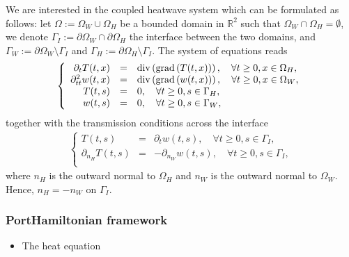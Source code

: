 \documentclass[letterpaper,10pt,english]{sphinxmanual}
\begin{document}
\sphinxAtStartPar
We are interested in the coupled heat\sphinxhyphen{}wave system which can be
formulated as follows: let \(\Omega := \Omega_W \cup \Omega_H\) be a
bounded domain in \(\mathbb{R}^2\) such that
\(\Omega_W \cap \Omega_H = \emptyset\), we denote
\(\Gamma_I := \partial\Omega_W \cap \partial\Omega_H\) the interface
between the two domains, and
\(\Gamma_W := \partial\Omega_W \setminus \Gamma_I\) and
\(\Gamma_H := \partial\Omega_H \setminus \Gamma_I\). The system of
equations reads
\begin{equation*}
\begin{split}\left\lbrace
\begin{array}{rcl}
\partial_t T(t,x) &=& {\rm div}\left( {\rm grad}\left( T(t,x) \right)\right), \quad \forall t\ge0, x \in \Omega_H, \\
\partial_{tt}^2 w(t,x) &=& {\rm div}\left( {\rm grad}\left( w(t,x) \right)\right), \quad \forall t\ge0, x \in \Omega_W, \\
T(t,s) &=& 0, \quad \forall t\ge0, s \in \Gamma_H, \\
w(t,s) &=& 0, \quad \forall t\ge0, s \in \Gamma_W, \\
\end{array}
\right.\end{split}
\end{equation*}
\sphinxAtStartPar
together with the transmission conditions across the interface
\begin{equation*}
\begin{split}\left\lbrace
\begin{array}{rcl}
T(t,s) &=& \partial_t w(t,s), \quad \forall t\ge0, s \in \Gamma_I, \\
\partial_{n_H} T(t,s) &=& - \partial_{n_W} w(t,s), \quad \forall t\ge0, s \in \Gamma_I, \\
\end{array}
\right.\end{split}
\end{equation*}
\sphinxAtStartPar
where \(n_H\) is the outward normal to \(\Omega_H\) and
\(n_W\) is the outward normal to \(\Omega_W\). Hence,
\(n_H = -n_W\) on \(\Gamma_I\).


\subsubsection{Port\sphinxhyphen{}Hamiltonian framework}
\label{\detokenize{examples/heat_wave:port-hamiltonian-framework}}\begin{itemize}
\item {} 
\sphinxAtStartPar
The heat equation

\end{itemize}
\end{document}
